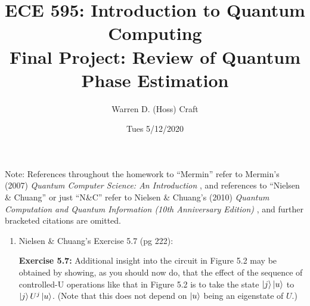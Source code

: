 \documentclass{article}
\title{ECE 595: Introduction to Quantum Computing\\
Final Project: Review of Quantum Phase Estimation}
\author{Warren D. (Hoss) Craft}
\date{Tues 5/12/2020}
\begin{document}
\maketitle

\flushleft

Note: References throughout the homework to ``Mermin'' refer to Mermin's (2007) \textit{Quantum Computer Science: An Introduction} \cite{Mermin_2007}, and references to ``Nielsen \& Chuang'' or just ``N\&C'' refer to Nielsen \& Chuang's (2010) \textit{Quantum Computation and Quantum Information (10th Anniversary Edition)} \cite{Nielsen_&_Chuang_2010}, and further bracketed citations are omitted.

\begin{enumerate}[label=\textbf{(\arabic*)}]


\item Nielsen \& Chuang's Exercise 5.7 (pg 222):
\vspace{0.1in}
\begin{adjustwidth}{100pt}{100pt}
\begin{mdframed}[hidealllines=true, backgroundcolor=gray!20]
\textbf{Exercise 5.7:} Additional insight into the circuit in Figure 5.2 may be obtained by showing, as you should now do, that the effect of the sequence of controlled-U operations like that in Figure 5.2 is to take the state $\ket{j}\ket{u}$ to $\ket{j}U^{j}\ket{u}$. (Note that this does not depend on $\ket{u}$ being an eigenstate of $U$.)
\end{mdframed}
\end{adjustwidth}


\end{enumerate}
\end{document}
